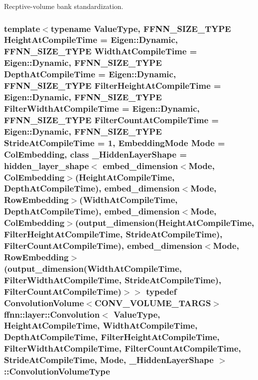 Recptive-\/volume bank standardization. 

\hypertarget{classffnn_1_1layer_1_1_convolution_afce446070a9d86d22f6b5b53fef7c7d0}{
\subsubsection[{Convolution\-Volume\-Type}]{\setlength{\rightskip}{0pt plus 5cm}template$<$typename Value\-Type, F\-F\-N\-N\-\_\-\-S\-I\-Z\-E\-\_\-\-T\-Y\-P\-E Height\-At\-Compile\-Time = Eigen\-::\-Dynamic, F\-F\-N\-N\-\_\-\-S\-I\-Z\-E\-\_\-\-T\-Y\-P\-E Width\-At\-Compile\-Time = Eigen\-::\-Dynamic, F\-F\-N\-N\-\_\-\-S\-I\-Z\-E\-\_\-\-T\-Y\-P\-E Depth\-At\-Compile\-Time = Eigen\-::\-Dynamic, F\-F\-N\-N\-\_\-\-S\-I\-Z\-E\-\_\-\-T\-Y\-P\-E Filter\-Height\-At\-Compile\-Time = Eigen\-::\-Dynamic, F\-F\-N\-N\-\_\-\-S\-I\-Z\-E\-\_\-\-T\-Y\-P\-E Filter\-Width\-At\-Compile\-Time = Eigen\-::\-Dynamic, F\-F\-N\-N\-\_\-\-S\-I\-Z\-E\-\_\-\-T\-Y\-P\-E Filter\-Count\-At\-Compile\-Time = Eigen\-::\-Dynamic, F\-F\-N\-N\-\_\-\-S\-I\-Z\-E\-\_\-\-T\-Y\-P\-E Stride\-At\-Compile\-Time = 1, Embedding\-Mode Mode = Col\-Embedding, class \-\_\-\-Hidden\-Layer\-Shape = hidden\-\_\-layer\-\_\-shape$<$              embed\-\_\-dimension$<$\-Mode, Col\-Embedding$>$(\-Height\-At\-Compile\-Time, Depth\-At\-Compile\-Time),              embed\-\_\-dimension$<$\-Mode, Row\-Embedding$>$(\-Width\-At\-Compile\-Time,  Depth\-At\-Compile\-Time),              embed\-\_\-dimension$<$\-Mode, Col\-Embedding$>$(output\-\_\-dimension(\-Height\-At\-Compile\-Time, Filter\-Height\-At\-Compile\-Time, Stride\-At\-Compile\-Time), Filter\-Count\-At\-Compile\-Time),              embed\-\_\-dimension$<$\-Mode, Row\-Embedding$>$(output\-\_\-dimension(\-Width\-At\-Compile\-Time,  Filter\-Width\-At\-Compile\-Time,  Stride\-At\-Compile\-Time), Filter\-Count\-At\-Compile\-Time)$>$$>$ typedef {\bf Convolution\-Volume}$<${\bf C\-O\-N\-V\-\_\-\-V\-O\-L\-U\-M\-E\-\_\-\-T\-A\-R\-G\-S}$>$ {\bf ffnn\-::layer\-::\-Convolution}$<$ Value\-Type, Height\-At\-Compile\-Time, Width\-At\-Compile\-Time, Depth\-At\-Compile\-Time, Filter\-Height\-At\-Compile\-Time, Filter\-Width\-At\-Compile\-Time, Filter\-Count\-At\-Compile\-Time, Stride\-At\-Compile\-Time, Mode, \-\_\-\-Hidden\-Layer\-Shape $>$\-::{\bf Convolution\-Volume\-Type}}}\label{classffnn_1_1layer_1_1_convolution_afce446070a9d86d22f6b5b53fef7c7d0}


